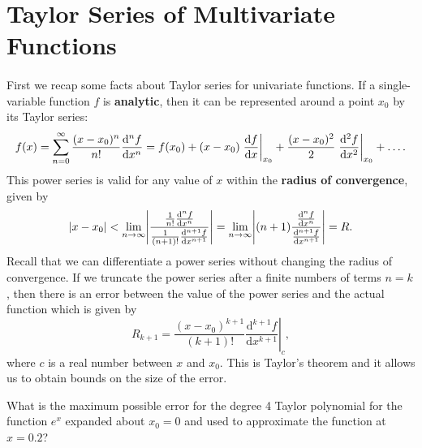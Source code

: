 \documentclass[../multivariate_calculus.tex]{subfiles}
\begin{document}
    \section{Taylor Series of Multivariate Functions}
        \paragraph{}
        First we recap some facts about Taylor series for univariate functions.
        If a single-variable function $f$ is \textbf{analytic}, then it can be represented around a point $x_0$ by its Taylor series:
        \begin{equation}
            f(x)=\sum_{n=0}^\infty\frac{(x-x_0)^n}{n!}\frac{\mathrm{d}^n f}{\mathrm{d}x^n}=f(x_0)+(x-x_0)\left.\frac{\mathrm{d}f}{\mathrm{d}x}\right|_{x_0}+\frac{(x-x_0)^2}{2}\left.\frac{\mathrm{d}^2{f}}{\mathrm{d}{x}^2}\right|_{x_0}+\dots.
        \end{equation}
        This power series is valid for any value of $x$ within the \textbf{radius of convergence}, given by
        \begin{equation}
            \abs{x-x_0}<\lim_{n\to\infty}\abs*{\frac{\frac{1}{n!}\frac{\mathrm{d}^n f}{\mathrm{d}x^n}}{\frac{1}{(n+1)!}\frac{\mathrm{d}^{n+1}f}{\mathrm{d}x^{n+1}}}}=\lim_{n\to\infty}\abs*{(n+1)\frac{\frac{\mathrm{d}^n f}{\mathrm{d}x^n}}{\frac{\mathrm{d}^{n+1}f}{\mathrm{d}x^{n+1}}}}=R.
        \end{equation}
        Recall that we can differentiate a power series without changing the radius of convergence.
        If we truncate the power series after a finite numbers of terms $n=k$, then there is an error between the value of the power series and the actual function which is given by
        \begin{equation}
            R_{k+1}=\frac{(x-x_0)^{k+1}}{(k+1)!}\left.\frac{\mathrm{d}^{k+1}f}{\mathrm{d}x^{k+1}}\right|_c,
        \end{equation} 
        where $c$ is a real number between $x$ and $x_0$.
        This is Taylor's theorem and it allows us to obtain bounds on the size of the error.
        \begin{example}
            What is the maximum possible error for the degree 4 Taylor polynomial for the function $e^x$ expanded about $x_0=0$ and used to approximate the function at $x=0.2$?
        \end{example}
\end{document}
